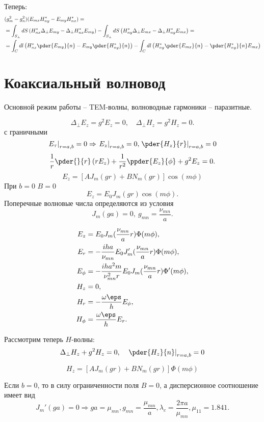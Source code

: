 Теперь:
\begin{align*}
	&(g_m^2 - g_n^2)(E_{mx}H_{ny}^* - E_{my}H_{nx}^*) =\\
	& = \int_{S_\perp} dS \left( H_{nx}^*\Delta_\perp E_{my} - \Delta_\perp H_{nx}^* E_{my} \right)
	-
	\int_{S_\perp} dS \left( H_{ny}^*\Delta_\perp E_{mx} - \Delta_\perp H_{ny}^* E_{mx} \right) =\\
	& = \int_C dl \left(H_{nx}^* \pder{E_{my}}{n} - E_{my}\pder{H_{ny}^*}{n}\right) -
	\int_C dl \left( H_{ny}^*\pder{E_{mx}}{n} - \pder{H_{ny}^*}{n} E_{mx} \right)
\end{align*}

\section{Коаксиальный волновод}

Основной режим работы -- TEM-волны, волноводные гармоники -- паразитные.

\[
	\Delta_\perp E_z = g^2 E_z = 0,\quad \Delta_\perp H_z = g^2 H_z = 0.
\]
с граничными
\[
	\left.E_\tau\right|_{r=a,b} = 0 \Rightarrow \left.E_z\right|_{r=a,b} = 0, \left.\pder{H_z}{r}\right|_{r=a,b} = 0
\]
\[
	\frac{1}{r}\pder{}{r}\left( rE_z \right) + \frac{1}{r^2}\ppder{E_z}{\phi} + g^2E_z = 0.
\]
\[
	E_z = [AJ_m(gr) + BN_m(gr)]\cos(m\phi)
\]
При \( b = 0 \) \( B = 0 \)
\[
	E_z = E_0J_m(gr)\cos(m\phi).
\]
Поперечные волновые числа определяются из условия
\[
	J_m(ga) = 0,\ g_{mn} = \frac{\nu_{mn}}{a}.
\]

\begin{align*}
	E_z &= E_0 J_m(\frac{\nu_{mn}}{a}r)\Phi(m\phi),\\
	E_r &= -\frac{iha}{\nu_{mn}}E_0 J_m'(\frac{\nu_{mn}}{a}r)\Phi(m\phi),\\
	E_\phi &= -\frac{iha^2m}{\nu_{mn}^2r}E_0 J_m(\frac{\nu_{mn}}{a}r)\Phi'(m\phi),\\
	H_z &= 0,\\
	H_r &= -\frac{\omega\eps}{h}E_\phi,\\
	H_\phi &= \frac{\omega\eps}{h}E_r.
\end{align*}


Рассмотрим теперь \( H \)-волны:
\[
	\Delta_\perp H_z + g^2H_z = 0,\quad \left.\pder{H_z}{n}\right|_{r=a,b}= 0
\]

\[
	H_z = [AJ_m(gr) + BN_m(gr)]\Phi(m\phi)
\]

Если \( b=0 \), то в силу ограниченности поля \(B = 0\), а дисперсионное соотношение имеет вид
\[
	J_m'(ga) = 0 \Rightarrow ga = \mu_{mn}, g_{mn} = \frac{\mu_{mn}}{a}, \lambda_c = \frac{2\pi a}{\mu_{mn}}, \mu_{11} = 1.841.
\]

